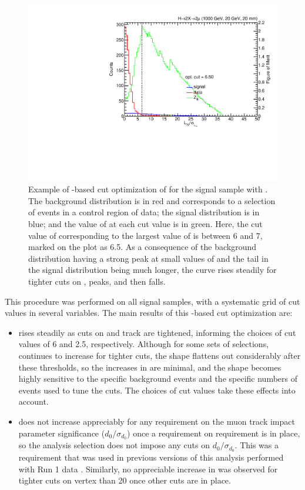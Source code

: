 \begin{figure}[htpb]
  \centering
  \includegraphics[width=\DFigWidth]{figures/displaced/OPT_LxySig_ZBi_HTo2XTo2Mu2J_1000_20_20.pdf}
  \caption[Example of \ZBi-based cut optimization of \LxySig.]{Example of \ZBi-based cut optimization of \LxySig for the \twoMu signal sample with . The background distribution is in red and corresponds to a selection of events in a control region of data; the signal distribution is in blue; and the value of \ZBi at each cut value is in green. Here, the cut value of \LxySig corresponding to the largest value of \ZBi is between 6 and 7, marked on the plot as 6.5. As a consequence of the background distribution having a strong peak at small values of \LxySig and the tail in the signal distribution being much longer, the \ZBi curve rises steadily for tighter cuts on \LxySig, peaks, and then falls.}
  \label{fig:dd:CutOptExample}
\end{figure}

This procedure was performed on all signal samples, with a systematic grid of cut values in several variables.
The main results of this \ZBi-based cut optimization are:
\pagebreak
\begin{itemize}
  \item \ZBi rises steadily as cuts on \LxySig and track \normchisq are tightened, informing the choices of cut values of 6 and 2.5, respectively. Although for some sets of selections, \ZBi continues to increase for tighter cuts, the shape flattens out considerably after these thresholds, so the increases in \ZBi are minimal, and the shape becomes highly sensitive to the specific background events and the specific numbers of events used to tune the cuts. The choices of cut values take these effects into account.
  \item \ZBi does not increase appreciably for any requirement on the muon track impact parameter significance ($d_0/\sigma_{d_{0}}$) once a requirement on \LxySig requirement is in place, so the analysis selection does not impose any cuts on $d_0/\sigma_{d_{0}}$. This was a requirement that was used in previous versions of this analysis performed with Run 1 data \cite{EXO-12-037,CMS-PAS-EXO-14-012}. Similarly, no appreciable increase in \ZBi was observed for tighter cuts on vertex \chisq than 20 once other cuts are in place.
\end{itemize}

